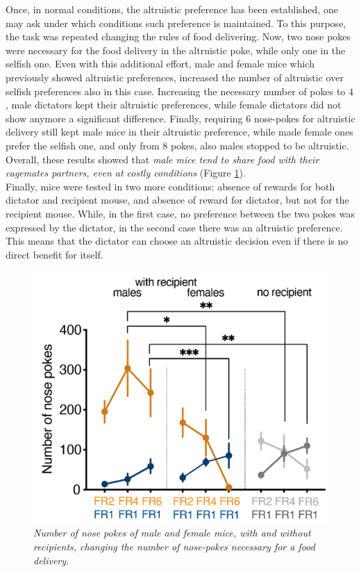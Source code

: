 \documentclass[12pt, a4paper]{report}
\begin{document}
Once, in normal conditions, the altruistic preference has been established, one may ask under which conditions such preference is maintained. To this purpose, the task was repeated changing the rules of food delivering. Now, two nose pokes were necessary for the food delivery in the altruistic poke, while only one in the selfish one. Even with this additional effort, male and female mice which previously showed altruistic preferences, increased the number of altruistic over selfish preferences also in this case. Increasing the necessary number of pokes to $4$, male dictators kept their altruistic preferences, while female dictators did not show anymore a significant difference. Finally, requiring $6$ nose-pokes for altruistic delivery still kept male mice in their altruistic preference, while made female ones prefer the selfish one, and only from $8$ pokes, also males stopped to be altruistic. Overall, these results showed that \textit{male mice tend to share food with their cagemates partners, even at costly conditions} (Figure \ref{number_pokes}).\\
Finally, mice were tested in two more conditions: absence of rewards for both dictator and recipient mouse, and absence of reward for dictator, but not for the recipient mouse. While, in the first case, no preference between the two pokes was expressed by the dictator, in the second case there was an altruistic preference. This means that the dictator can choose an altruistic decision even if there is no direct benefit for itself.


\begin{figure}[H]
	\begin{center}
		\includegraphics[scale=0.55]{number_pokes.png} 
	\end{center} 
	\caption{\textit{Number of nose pokes of male and female mice, with and without recipients, changing the number of nose-pokes necessary for a food delivery.}} \label{number_pokes}
	
\end{figure}
\end{document}

